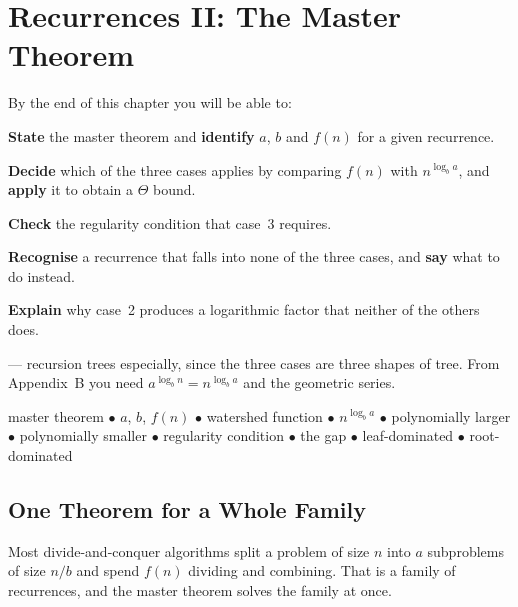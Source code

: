 \chapter{Recurrences II: The Master Theorem}\label{ch:master}

\begin{outcomes}
By the end of this chapter you will be able to:
\begin{tight}
  \item \textbf{State} the master theorem and \textbf{identify} $a$, $b$ and
        $f(n)$ for a given recurrence.
  \item \textbf{Decide} which of the three cases applies by comparing $f(n)$
        with $n^{\log_{b} a}$, and \textbf{apply} it to obtain a $\Theta$
        bound.
  \item \textbf{Check} the regularity condition that case~3 requires.
  \item \textbf{Recognise} a recurrence that falls into none of the three cases,
        and \textbf{say} what to do instead.
  \item \textbf{Explain} why case~2 produces a logarithmic factor that neither
        of the others does.
\end{tight}
\end{outcomes}

\begin{prereq}
 --- recursion trees especially, since the three cases are
three shapes of tree. From Appendix~B you need $a^{\log_{b} n} =
n^{\log_{b} a}$ and the geometric series.
\end{prereq}

\begin{keyterms}
master theorem $\bullet$ $a$, $b$, $f(n)$ $\bullet$ watershed function
$\bullet$ $n^{\log_{b} a}$ $\bullet$ polynomially larger $\bullet$ polynomially
smaller $\bullet$ regularity condition $\bullet$ the gap $\bullet$
leaf-dominated $\bullet$ root-dominated
\end{keyterms}

\section{One Theorem for a Whole Family}

Most divide-and-conquer algorithms split a problem of size $n$ into $a$
subproblems of size $n/b$ and spend $f(n)$ dividing and combining. That is a
family of recurrences, and the master theorem solves the family at once.

